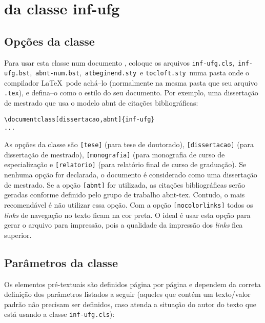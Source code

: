 \chapter{ da classe \textsf{inf-ufg}}
\label{cap:descr}

\section{Opções da classe}
\label{sec:opcoes}
Para usar esta classe num documento \LaTeXe, coloque os arquivos 
\verb|inf-ufg.cls|,\ \verb|inf-ufg.bst|,\ \verb|abnt-num.bst|,\ \verb|atbeginend.sty|\ e \verb|tocloft.sty|\ numa pasta onde o compilador \LaTeX\ pode achá--lo (normalmente na mesma pasta que seu arquivo \verb|.tex|), e defina--o como o estilo do seu documento. Por exemplo, uma dissertação de mestrado que usa o modelo abnt de citações bibliográficas:
\begin{verbatim}
\documentclass[dissertacao,abnt]{inf-ufg}
...

\end{verbatim}

As opções da classe são \verb|[tese]| (para tese de doutorado), \verb|[dissertacao]| (para dissertação de mestrado), \verb|[monografia]| (para monografia de curso de especialização e \verb|[relatorio]| (para relatório final de curso de graduação). Se nenhuma opção for declarada, o documento é considerado como uma dissertação de mestrado. Se a opção \verb|[abnt]| for utilizada, as citações bibliográficas serão geradas conforme definido pelo grupo de trabalho \textsf{abnt-tex}. Contudo, o mais recomendável é não utilizar essa opção. Com a opção \verb|[nocolorlinks]| todos os {\em links} de navegação no texto ficam na cor preta. O ideal é usar esta opção para gerar o arquivo para impressão, pois a qualidade da impressão dos {\em links} fica superior.


\section{Parâmetros da classe}
\label{sec:param}
Os elementos pré-textuais são definidos página por página e dependem da correta definição dos parâmetros listados a seguir (aqueles que contém um texto/valor padrão não precisam ser definidos, caso atenda a situação do autor do texto que está usando a classe \verb|inf-ufg.cls|):

